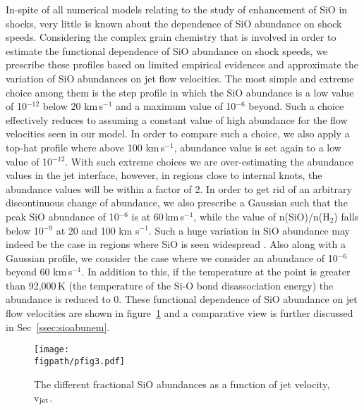 \documentclass[useAMS,usenatbib]{mn2e}
\newcommand{\figpath}{../NEWFIGS}
\begin{document}
In-spite of all numerical models relating to the study of enhancement
of SiO in shocks, very little is known about the dependence of SiO
abundance on shock speeds. Considering the complex grain
chemistry that is involved in order to estimate the functional
dependence of SiO abundance on shock speeds, we prescribe these
profiles based on limited empirical evidences 
and approximate the variation of SiO abundances on jet flow velocities.   
The most simple and extreme choice among
them is the step profile in which the SiO abundance is a low value of
10$^{-12}$ below 20 km\,s$^{-1}$ and a maximum value of 10$^{-6}$ beyond. 
Such a choice effectively reduces to assuming a constant value of high abundance for the 
flow velocities seen in our model. In order to compare such a choice, 
we also apply a top-hat profile where above 100 km\,s$^{-1}$, abundance value 
is set again to a low value of 10$^{-12}$. 
With such extreme choices we are over-estimating the abundance values in 
the  jet interface, however, 
in regions close to internal knots, the abundance values will be within a factor of 2. 
In order to get rid of an arbitrary discontinuous change of abundance, we also
prescribe a Gaussian such that the peak SiO abundance of 10$^{-6}$ is at
60\,km\,s$^{-1}$, while the value of n(SiO)/n(H$_{2}$) falls below
10$^{-9}$ at 20 and 100 km s$^{-1}$. Such a huge variation in SiO
abundance may indeed be the case in regions where SiO is seen
widespread \citep[e.g.,][also see section~\ref{sec:discussion}]
{Lefloch:1998p13983}. Also along with a Gaussian profile, we consider
the case where we consider an abundance of 10$^{-6}$ beyond 60 km\,s$^{-1}$.   
In addition to this, if the temperature at the point is greater than
92,000\,K (the temperature of the Si-O bond disassociation energy) 
the abundance is reduced to 0. 
These functional dependence of SiO abundance on jet flow velocities are shown in figure~\ref{abun} 
and a comparative view is further discussed in Sec~\ref{ssec:sioabunem}.
%

 \begin{figure}
  \texttt{[image: \\figpath/pfig3.pdf]}%
  \caption{The different fractional SiO abundances as a function of
    jet velocity, v$_{\rm jet}$.}
  \label{abun}
 \end{figure}

\end{document}
